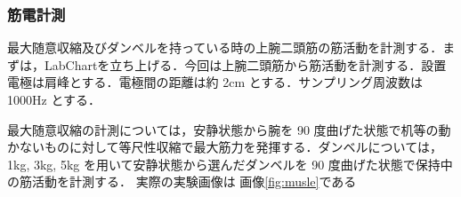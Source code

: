 \documentclass[dvipdfmx, titlepage, t]{jsarticle}
\begin{document}
    \subsubsection{筋電計測}
    最大随意収縮及びダンベルを持っている時の上腕二頭筋の筋活動を計測する．まずは，LabChartを立ち上げる．今回は上腕二頭筋から筋活動を計測する．設置電極は肩峰とする．電極間の距離は約 2cm とする．サンプリング周波数は 1000Hz とする．

    最大随意収縮の計測については，安静状態から腕を 90 度曲げた状態で机等の動かないものに対して等尺性収縮で最大筋力を発揮する．ダンベルについては，1kg, 3kg, 5kg を用いて安静状態から選んだダンベルを 90 度曲げた状態で保持中の筋活動を計測する． 実際の実験画像は 画像\ref{fig:musle}である


\begin{figure}[H] %
    \centering %


\end{figure}
\end{document}
